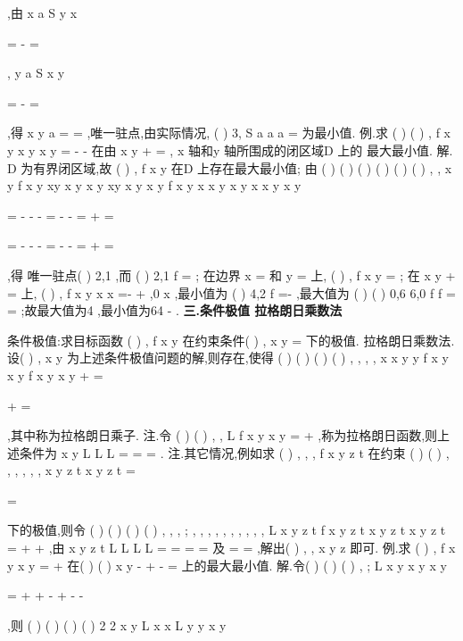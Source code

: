 ,由
x
a
S
y
x


=
-
=




,
y
a
S
x
y


=
-
=




,得 
x
y
a
=
=
,唯一驻点,由实际情况, (
)
3,
S
a
a
a
=
为最小值. 
\textcolor{lyred}{例}.求
(
)
(
)
,
f x y
x y
x
y
=
-
-
在由
x
y
+
=
, x 轴和y 轴所围成的闭区域D 上的 
最大最小值. 
解. D 为有界闭区域,故
(
)
,
f x y 在D 上存在最大最小值; 
由
(
)
(
)
(
)
(
)
(
)
(
)
,
,
x
y
f
x y
xy
x
y
x y
xy
x
y
x
y
f
x y
x
x
y
x y
x
x
y
x
y

=
-
-
-
=
-
-
=
+
=


\Rightarrow 


=
-
-
-
=
-
-
=
+
=



,得 
唯一驻点(
)
2,1 ,而
(
)
2,1
f
=
; 在边界
x =
和
y =
上,
(
)
,
f x y =
; 
在
x
y
+
=
上,
(
)
,
f x y
x
x
=-
+
,0
x
\le 
\le 
,最小值为
(
)
4,2
f
=-
,最大值为 
(
)
(
)
0,6
6,0
f
f
=
=
;故最大值为4 ,最小值为64
-
. 
\vspace{4pt}
{\bfseries \textcolor{lyred}{三.条件极值 拉格朗日乘数法}}

\textcolor{lyred}{条件极值}:求目标函数
(
)
,
f x y 在约束条件(
)
,
x y
\varphi 
=
下的极值. 
\textcolor{lyred}{拉格朗日乘数法}.设(
)
,
x
y
为上述条件极值问题的解,则存在\lambda ,使得 
(
)
(
)
(
)
(
)
,
,
,
,
x
x
y
y
f
x
y
x
y
f
x
y
x
y
\lambda \varphi 
\lambda \varphi 
+
=

+
=

,其中\lambda 称为\textcolor{lyred}{拉格朗日乘子}. 
\textcolor{lyred}{注}.令
(
)
(
)
,
,
L
f x y
x y
\lambda \varphi 
=
+
,称为\textcolor{lyred}{拉格朗日函数},则上述条件为
x
y
L
L
L\lambda 
=
=
=
. 
\textcolor{lyred}{注}.其它情况,例如求
(
)
, , ,
f x y z t 在约束
(
)
(
)
, , ,
, , ,
x y z t
x y z t
\varphi 
\zeta 
=

=

下的极值,则令 
(
)
(
)
(
)
(
)
, , , ; ,
, , ,
, , ,
, , ,
L x y z t
f x y z t
x y z t
x y z t
\lambda \mu 
\lambda \varphi 
\mu \zeta 
=
+
\cdots 
+
\cdots 
,由 
x
y
z
t
L
L
L
L
=
=
=
=
及
\varphi 
\zeta 
=
=
,解出(
)
, ,
x y z 即可. 
\textcolor{lyred}{例}.求
(
)
,
f x y
x
y
=
+
在(
)
(
)
x
y
-
+
-
=
上的最大最小值. 
解.令(
)
(
)
(
)
, ;
L x y
x
y
x
y
\lambda 
\lambda 

=
+
+
-
+
-
-



,则 
(
)
(
)
(
)
(
)
2 2
x
y
L
x
x
L
y
y
x
y
\lambda 
\lambda 

